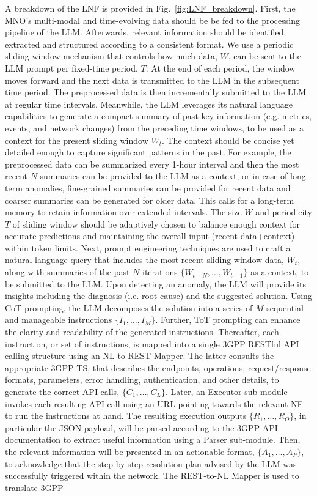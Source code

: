 A breakdown of the \gls{LNF} is provided in Fig.~\ref{fig:LNF_breakdown}. First, the \gls{MNO}'s multi-modal and time-evolving data should be be fed to the processing pipeline of the \gls{LLM}. Afterwards, relevant information should be identified, extracted and structured according to a consistent format. We use a periodic sliding window mechanism that controls how much data, $W$, can be sent to the \gls{LLM} prompt per fixed-time period, $T$. At the end of each period, the window moves forward and the next data is transmitted to the \gls{LLM} in the subsequent time period. The preprocessed data is then incrementally submitted to the \gls{LLM} at regular time intervals. Meanwhile, the \gls{LLM} leverages its natural language capabilities to generate a compact summary of past key information (e.g. metrics, events, and network changes) from the preceding time windows, to be used as a context for the present sliding window $W_{t}$. The context should be concise yet detailed enough to capture significant patterns in the past. For example, the preprocessed data can be summarized every 1-hour interval and then the most recent $N$ summaries can be provided to the \gls{LLM} as a context, or in case of long-term anomalies, fine-grained summaries can be provided for recent data and coarser summaries can be generated for older data. This calls for a long-term memory to retain information over extended intervals. The size $W$ and periodicity $T$ of sliding window should be adaptively chosen to balance enough context for accurate predictions and maintaining the overall input (recent data+context) within token limits. Next, prompt engineering techniques are used to craft a natural language query that includes the most recent sliding window data, $W_{t}$, along with summaries of the past $N$ iterations $\{W_{t-N}, \ldots, W_{t-1}\}$ as a context, to be submitted to the \gls{LLM}. Upon detecting an anomaly, the \gls{LLM} will provide its insights including the diagnosis (i.e. root cause) and the suggested solution. Using \gls{CoT} prompting, the \gls{LLM} decomposes the solution into a series of $M$ sequential and manageable instructions $\{I_{1}, \ldots, I_{M}\}$. Further, \gls{ToT} prompting can enhance the clarity and readability of the generated instructions. Thereafter, each instruction, or set of instructions, is mapped into a single \gls{3GPP} \gls{RESTful} API calling structure using an NL-to-REST Mapper. The latter consults the appropriate \gls{3GPP} \gls{TS}, that describes the endpoints, operations, request/response formats, parameters, error handling, authentication, and other details, to generate the correct API calls, $\{C_{1}, \ldots, C_{L}\}$. Later, an Executor sub-module invokes each resulting API call using an URL pointing towards the relevant \gls{NF}  to run the instructions at hand. The resulting execution outputs $\{R_{1}, \ldots, R_{O}\}$, in particular the JSON payload, will be parsed according to the \gls{3GPP} API documentation to extract useful information using a Parser sub-module. Then, the relevant information will be presented in an actionable format, $\{A_{1}, \ldots, A_{P}\}$, to acknowledge that the step-by-step resolution plan advised by the \gls{LLM} was successfully triggered within the network. The REST-to-NL Mapper is used to translate \gls{3GPP} 